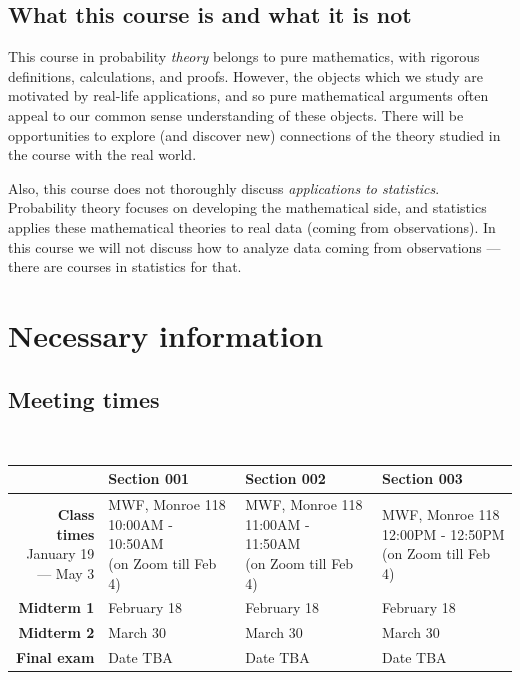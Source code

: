 \documentclass[oneside,11pt]{amsart}
\begin{document}
\subsection*{What this course is and what it is not}

This course in probability \emph{theory} belongs to pure mathematics, with
rigorous definitions, calculations, and proofs. However, the objects which we
study are motivated by real-life applications, and so pure mathematical
arguments often appeal to our common sense understanding of these objects.
There will be opportunities to explore (and discover new) connections of the
theory studied in the course with the real world.

Also, this course does not thoroughly discuss \emph{applications to statistics}.
Probability
theory focuses on developing the mathematical side, and statistics applies
these mathematical theories to real data (coming from observations). In this
course we will not discuss how to analyze data coming from observations ---
there are courses in statistics for that.

\section{Necessary information}
\label{sec:necc}

\subsection{Meeting times}{\ }\\
\label{sub:meeting_times}

\begin{tabular}{|r|l|l|l|}
	\hline
	&Section 001
	&Section 002
	&Section 003
	\\
	\hline
	\rule{0pt}{34pt}
	\parbox{.2\textwidth}{\textbf{Class times}\\
	January 19\\\qquad  --- May 3}
	& \parbox{.22\textwidth}{MWF, Monroe 118\\ 10:00AM - 10:50AM\\ (on Zoom till Feb 4)}
	& \parbox{.22\textwidth}{MWF, Monroe 118\\ 11:00AM - 11:50AM\\ (on Zoom till Feb 4)}
	& \parbox{.22\textwidth}{MWF, Monroe 118\\ 12:00PM - 12:50PM\\ (on Zoom till Feb 4)}
	\\[8pt] \hline
	\textbf{Midterm 1}   
	& February 18
	& February 18
	& February 18
	 \\ \hline
	 \textbf{Midterm 2}   
	 & March 30
	 & March 30
	 & March 30
	 \\ \hline
	 \textbf{Final exam}     
		& Date TBA	
		& Date TBA	
		& Date TBA	
	 \\ \hline
\end{tabular}
\end{document}
